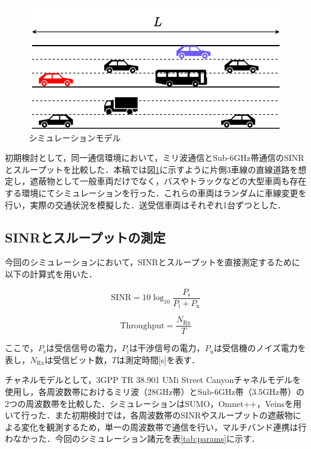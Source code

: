 \documentclass[10pt, twocolumn, a4j, platex]{jsarticle}	%
\newcommand{\wfig}[1]{図\ref{fig:#1}}%
\newcommand{\wtab}[1]{表\ref{tab:#1}}%
\begin{document}
\begin{figure}[tb]
	\centering
	\includegraphics[width=0.95\linewidth]{./images/model.drawio.png}
	\caption{シミュレーションモデル} \label{fig:model}
\end{figure}

初期検討として，同一通信環境において，ミリ波通信とSub-6GHz帯通信のSINRとスループットを比較した．本稿では\wfig{model}に示すように片側3車線の直線道路を想定し，遮蔽物として一般車両だけでなく，バスやトラックなどの大型車両も存在する環境にてシミュレーションを行った．これらの車両はランダムに車線変更を行い，実際の交通状況を模擬した．送受信車両はそれぞれ1台ずつとした．

\subsection{SINRとスループットの測定}

今回のシミュレーションにおいて，SINRとスループットを直接測定するために以下の計算式を用いた．

\begin{equation}
	\mathrm{SINR} = 10 \log_{10} \frac{P_{\mathrm{s}}}{P_{\mathrm{i}} + P_{\mathrm{n}}}
\end{equation}

\begin{equation}
	\mathrm{Throughput} = \frac{N_{\mathrm{Rx}}}{T}
\end{equation}

ここで，$P_{\mathrm{s}}$は受信信号の電力，$P_{\mathrm{i}}$は干渉信号の電力，$P_{\mathrm{n}}$は受信機のノイズ電力を表し，$N_{\mathrm{Rx}}$は受信ビット数，$T$は測定時間[s]を表す．

チャネルモデルとして，3GPP TR 38.901 UMi Street Canyonチャネルモデルを使用し，各周波数帯におけるミリ波（28GHz帯）とSub-6GHz帯（3.5GHz帯）の2つの周波数帯を比較した．シミュレーションはSUMO，Omnet++，Veinsを用いて行った．また初期検討では，各周波数帯のSINRやスループットの遮蔽物による変化を観測するため，単一の周波数帯で通信を行い，マルチバンド連携は行わなかった．今回のシミュレーション諸元を\wtab{params}に示す．
\end{document}
